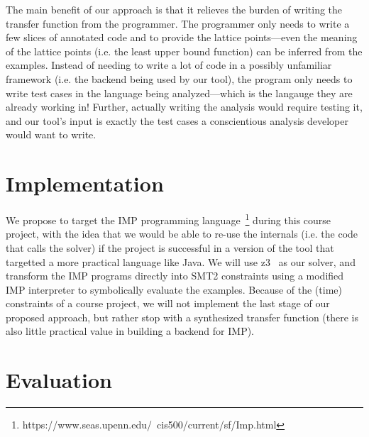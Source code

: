 \documentclass[10pt,conference]{IEEEtran}
\begin{document}
The main benefit of our approach is that it relieves the burden of
writing the transfer function from the programmer. The programmer
only needs to write a few slices of annotated code and to provide
the lattice points---even the meaning of the lattice points (i.e. the least
upper bound function) can be inferred from the examples. Instead of
needing to write a lot of code in a possibly unfamiliar framework
(i.e. the backend being used by our tool), the program only needs to
write test cases in the language being analyzed---which is the langauge
they are already working in! Further, actually writing the analysis
would require testing it, and our tool's input is exactly the test
cases a conscientious analysis developer would want to write.

\section{Implementation}

We propose to target the IMP programming language~\footnote{https://www.seas.upenn.edu/~cis500/current/sf/Imp.html}
during this course project, with the idea that we would be able to re-use the internals
(i.e. the code that calls the solver) if the project is successful in
a version of the tool that targetted a more practical language like Java.
We will use z3~\cite{z3} as our solver, and transform the IMP programs directly
into SMT2 constraints using a modified IMP interpreter to symbolically evaluate
the examples. Because of the (time) constraints of a course project, we will not
implement the last stage of our proposed approach, but rather stop with a
synthesized transfer function (there is also little practical value in building
a backend for IMP).

\section{Evaluation}
\end{document}
